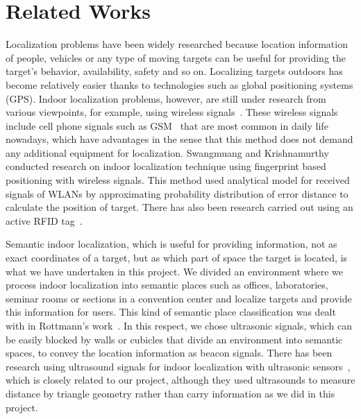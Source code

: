 \section{Related Works}
\label{sec:related-works}


Localization problems have been widely researched because location information of people, vehicles or any type of moving targets can be useful for providing the target's behavior, availability, safety and so on. Localizing targets outdoors has become relatively easier thanks to technologies such as global positioning systems (GPS). Indoor localization problems, however, are still under research from various viewpoints, for example, using wireless signals~\cite{liu2007}. These wireless signals include cell phone signals such as GSM~\cite{otsason2005accurate} that are most common in daily life nowadays, which have advantages in the sense that this method does not demand any additional equipment for localization. Swangmuang and Krishnamurthy~\cite{Swangmuang2008} conducted research on indoor localization technique using fingerprint based positioning with wireless signals. This method used analytical model for received signals of WLANs by approximating probability distribution of error distance to calculate the position of target. There has also been research carried out using an active RFID tag~\cite{Jin2006}.

Semantic indoor localization, which is useful for providing information, not as exact coordinates of a target, but as which part of space the target is located, is what we have undertaken in this project. We divided an environment where we process indoor localization into semantic places such as offices, laboratories, seminar rooms or sections in a convention center and localize targets and provide this information for users. This kind of semantic place classification was dealt with in Rottmann's work~\cite{rottmann2005semantic}. In this respect, we chose ultrasonic signals, which can be easily blocked by walls or cubicles that divide an environment into semantic spaces, to convey the location information as beacon signals. There has been research using ultrasound signals for indoor localization with ultrasonic sensors~\cite{feng1997mobile}, which is closely related to our project, although they used ultrasounds to measure distance by triangle geometry rather than carry information as we did in this project.



